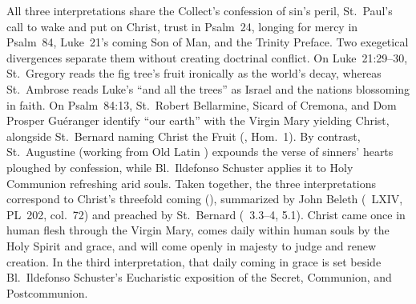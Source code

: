 All three interpretations share the Collect's confession of sin's peril, St.~Paul's call to wake and put on Christ, trust in Psalm~24, longing for mercy in Psalm~84, Luke~21's coming Son of Man, and the Trinity Preface. Two exegetical divergences separate them without creating doctrinal conflict. On Luke~21:29--30, St.~Gregory reads the fig tree's fruit ironically as the world's decay, whereas St.~Ambrose reads Luke's ``and all the trees'' as Israel and the nations blossoming in faith. On Psalm~84:13, St.~Robert Bellarmine, Sicard of Cremona, and Dom Prosper Gu\'eranger identify ``our earth'' with the Virgin Mary yielding Christ, alongside St.~Bernard naming Christ the Fruit (, Hom.~1). By contrast, St.~Augustine (working from Old Latin ) expounds the verse of sinners' hearts ploughed by confession, while Bl.~Ildefonso Schuster applies it to Holy Communion refreshing arid souls. Taken together, the three interpretations correspond to Christ's threefold coming (), summarized by John Beleth (~LXIV, PL~202, col.~72) and preached by St.~Bernard (~3.3--4, 5.1). Christ came once in human flesh through the Virgin Mary, comes daily within human souls by the Holy Spirit and grace, and will come openly in majesty to judge and renew creation. In the third interpretation, that daily coming in grace is set beside Bl.~Ildefonso Schuster's Eucharistic exposition of the Secret, Communion, and Postcommunion.
